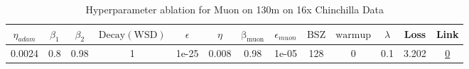\begin{table}[H]
\centering
\caption{Hyperparameter ablation for Muon on 130m on 16x Chinchilla Data}
\label{tab:ablation_muon_130m_16}
\begin{tabular}{ccccccccccccc}
\toprule
$\eta_{adam}$ & $\beta_1$ & $\beta_2$ & $\mathrm{Decay (WSD)}$ & $\epsilon$ & $\eta$ & $\mathrm{\beta_{muon}}$ & $\epsilon_{muon}$ & $\mathrm{BSZ}$ & $\mathrm{warmup}$ & $\lambda$ & Loss & Link \\
\midrule
0.0024 & 0.8 & 0.98 & 1 & 1e-25 & 0.008 & 0.98 & 1e-05 & 128 & 0 & 0.1 & 3.202 & \href{https://wandb.ai/stanford-mercury/optimizer-scaling/runs/sweep-130m-42B-muoncedd383lr0.008-wd0.1-minlr0-warmup0-b10.8-b20-89555c}{0} \\
\midrule
\bottomrule
\end{tabular}
\end{table}

